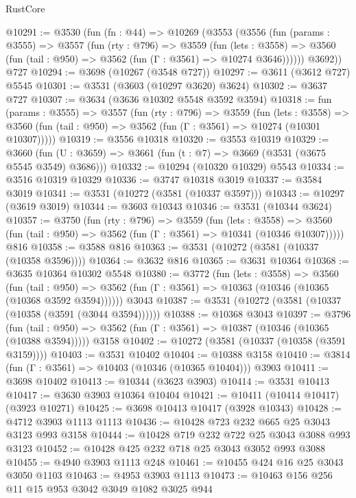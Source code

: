 \begin{lexlean}{RustCore}
\begin{coremodule}
@10291 := @3530
    (fun (fn : @44) =>
    @10269
      (@3553
        (@3556
          (fun (params : @3555) =>
          @3557
            (fun (rty : @796) =>
            @3559
              (fun (lets : @3558) =>
              @3560 (fun (tail : @950) => @3562 (fun (Γ : @3561) => @10274 @3646))))))
        @3692))
    @727
@10294 := @3698 (@10267 (@3548 @727))
@10297 := @3611 (@3612 @727) @5545
@10301 := @3531 (@3603 (@10297 @3620) @3624)
@10302 := @3637 @727
@10307 := @3634 (@3636 @10302 @5548 @3592 @3594)
@10318 := fun (params : @3555) =>
  @3557
    (fun (rty : @796) =>
    @3559
      (fun (lets : @3558) =>
      @3560 (fun (tail : @950) => @3562 (fun (Γ : @3561) => @10274 (@10301 @10307)))))
@10319 := @3556 @10318
@10320 := @3553 @10319
@10329 := @3660 (fun (U : @3659) => @3661 (fun (t : @7) => @3669 (@3531 (@3675 @5545 @3549) @3686)))
@10332 := @10294 (@10320 @10329) @5543
@10334 := @3516 @10319 @10329
@10336 := @3747 @10318 @3019
@10337 := @3584 @3019
@10341 := @3531 (@10272 (@3581 (@10337 @3597)))
@10343 := @10297 (@3619 @3019)
@10344 := @3603 @10343
@10346 := @3531 (@10344 @3624)
@10357 := @3750
    (fun (rty : @796) =>
    @3559
      (fun (lets : @3558) =>
      @3560 (fun (tail : @950) => @3562 (fun (Γ : @3561) => @10341 (@10346 @10307)))))
    @816
@10358 := @3588 @816
@10363 := @3531 (@10272 (@3581 (@10337 (@10358 @3596))))
@10364 := @3632 @816
@10365 := @3631 @10364
@10368 := @3635 @10364 @10302 @5548
@10380 := @3772
    (fun (lets : @3558) =>
    @3560
      (fun (tail : @950) =>
      @3562 (fun (Γ : @3561) => @10363 (@10346 (@10365 (@10368 @3592 @3594))))))
    @3043
@10387 := @3531 (@10272 (@3581 (@10337 (@10358 (@3591 (@3044 @3594))))))
@10388 := @10368 @3043
@10397 := @3796
    (fun (tail : @950) => @3562 (fun (Γ : @3561) => @10387 (@10346 (@10365 (@10388 @3594)))))
    @3158
@10402 := @10272 (@3581 (@10337 (@10358 (@3591 @3159))))
@10403 := @3531 @10402
@10404 := @10388 @3158
@10410 := @3814 (fun (Γ : @3561) => @10403 (@10346 (@10365 @10404))) @3903
@10411 := @3698 @10402
@10413 := @10344 (@3623 @3903)
@10414 := @3531 @10413
@10417 := @3630 @3903 @10364 @10404
@10421 := @10411 (@10414 @10417) (@3923 @10271)
@10425 := @3698 @10413 @10417 (@3928 @10343)
@10428 := @4712 @3903 @1113 @1113
@10436 := @10428 @723 @232 @665 @25 @3043 @3123 @993 @3158
@10444 := @10428 @719 @232 @722 @25 @3043 @3088 @993 @3123
@10452 := @10428 @425 @232 @718 @25 @3043 @3052 @993 @3088
@10455 := @4940 @3903 @1113 @248
@10461 := @10455 @424 @16 @25 @3043 @3050 @1103
@10463 := @4953 @3903 @1113
@10473 := @10463 @156 @256 @11 @15 @953 @3042 @3049 @1082 @3025 @944

\end{coremodule}
\end{lexlean}
